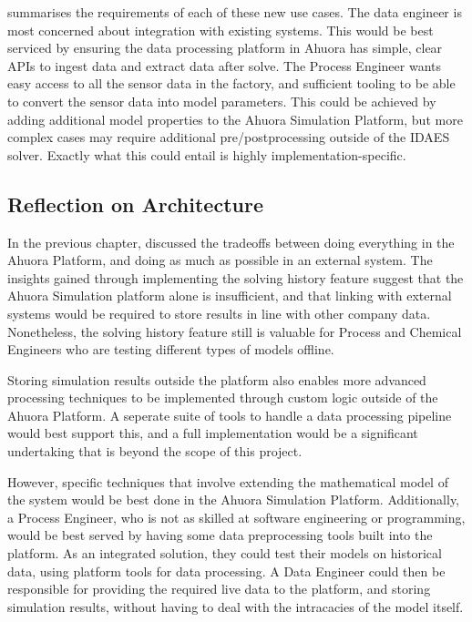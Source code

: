  summarises the requirements of each of these new use cases. The data engineer is most concerned about integration with existing systems. This would be best serviced by ensuring the data processing platform in Ahuora has simple, clear APIs to ingest data and extract data after solve. The Process Engineer wants easy access to all the sensor data in the factory, and sufficient tooling to be able to convert the sensor data into model parameters. This could be achieved by adding additional model properties to the Ahuora Simulation Platform, but more complex cases may require additional pre/postprocessing outside of the IDAES solver. Exactly what this could entail is highly implementation-specific.

\subsection{Reflection on Architecture}

In the previous chapter,  discussed the tradeoffs between doing everything in the Ahuora Platform, and doing as much as possible in an external system. The insights gained through implementing the solving history feature suggest that the Ahuora Simulation platform alone is insufficient, and that linking with external systems would be required to store results in line with other company data. Nonetheless, the solving history feature still is valuable for Process and Chemical Engineers who are testing different types of models offline.

Storing simulation results outside the platform also enables more advanced processing techniques to be implemented through custom logic outside of the Ahuora Platform. 
A seperate suite of tools to handle a data processing pipeline would best support this, and a full implementation would be a significant undertaking that is beyond the scope of this project. 

However, specific techniques that involve extending the mathematical model of the system would be best done in the Ahuora Simulation Platform. Additionally, a Process Engineer, who is not as skilled at software engineering or programming, would be best served by having some data preprocessing tools built into the platform. As an integrated solution, they could test their models on historical data, using platform tools for data processing. A Data Engineer could then be responsible for providing the required live data to the platform, and storing simulation results, without having to deal with the intracacies of the model itself. 



